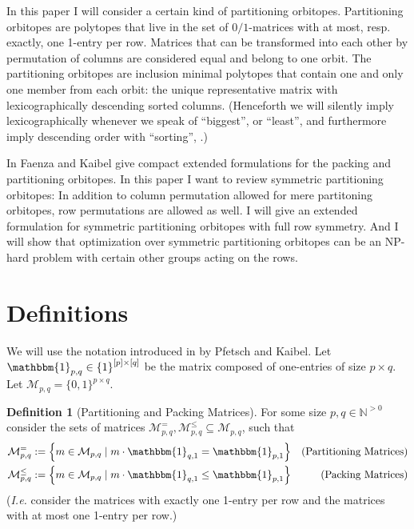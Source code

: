 \documentclass[a4paper]{amsart}
\theoremstyle{lemma}
\theoremstyle{definition}
\newtheorem{defn}[theorem]{Definition}
\theoremstyle{remark}
\def\Ie{\emph{I.e.}}
\newcommand\mpar[1]{\marginpar {\flushleft\sffamily\small #1}}
\newcommand{\todo}[1]{\mpar{#1}}
\newcommand{\lrE}[1]{\ensuremath{\left[ #1 \right]}}
\newcommand{\lrM}[1]{\ensuremath{\left\{ #1 \right\}}}
\newcommand{\naturals}{\ensuremath{\mathbb{N}}}
\newcommand{\M}{\ensuremath{\mathcal{M}}}
\begin{document}
In this paper I will consider a certain kind of partitioning
orbitopes.  Partitioning orbitopes are polytopes that live in the set
of \(0/1\)-matrices with at most, resp. exactly, one 1-entry per row.
Matrices that can be transformed into each other by permutation of
columns are considered equal and belong to one orbit.  The
partitioning orbitopes are inclusion minimal polytopes that contain
one and only one member from each orbit: the unique representative
matrix with lexicographically descending sorted columns.  (Henceforth
we will silently imply lexicographically whenever we speak of
``biggest'', or ``least'', and furthermore imply descending order with
``sorting'', .)

In \cite{faenza-2008} Faenza and Kaibel give compact extended
formulations for the packing and partitioning orbitopes.  In this
paper I want to review symmetric partitioning orbitopes: In addition
to column permutation allowed for mere partitoning orbitopes, row
permutations are allowed as well.  I will give an extended formulation
for symmetric partitioning orbitopes with full row symmetry. And I
will show that optimization over symmetric partitioning orbitopes can
be an NP-hard problem \todo{or NP complete?} with certain other groups
acting on the rows.



\section{Definitions}
We will use the notation introduced in \cite{orbi} by Pfetsch
and Kaibel.  Let \(\mathbbm{1}_{p,q} \in \lrM{1}^{\lrE{p}
  \times \lrE{q}}\) be the matrix composed of one-entries of size \(p \times q\).
Let \(\M_{p,q} = \{0, 1\}^{p \times q} \). 

\begin{defn}[Partitioning and Packing Matrices]
  For some size \(p, q \in \naturals^{>0}\) consider the sets of
  matrices \(\M_{p,q}^{=},\M_{p,q}^{\leq} \subseteq \M_{p, q}\), such
  that 
  \begin{align}
    \M_{p,q}^{=} & := \lrM{m \in \M_{p,q} \mid m \cdot \mathbbm{1}_{q, 1} = \mathbbm{1}_{p, 1}} & \text{(Partitioning Matrices)}\\
    \M_{p,q}^{\leq} & := \lrM{m \in \M_{p,q} \mid m \cdot \mathbbm{1}_{q, 1} \leq \mathbbm{1}_{p, 1}} & \text{(Packing Matrices)}
  \end{align}
  (\Ie{} consider the matrices with exactly one 1-entry per row and the matrices with at most one 1-entry per row.)
\end{defn}
\end{document}

